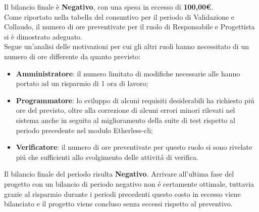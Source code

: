 	Il bilancio finale è \textbf{Negativo}, con una spesa in eccesso di \textbf{100,00\euro}. \\ Come riportato nella tabella del consuntivo per il periodo di Validazione e Collaudo, il numero di ore preventivate per il ruolo di Responsabile e Progettista si è dimostrato adeguato. \\ Segue un'analisi delle motivazioni per cui gli altri ruoli hanno necessitato di un numero di ore differente da quanto previsto:
	\begin{itemize}
		\item \textbf{Amministratore}: il numero limitato di modifiche necessarie alle \NdP{} hanno portato ad un risparmio di 1 ora di lavoro;
		\item \textbf{Programmatore}: lo sviluppo di alcuni requisiti desiderabili ha richiesto piú ore del previsto, oltre alla correzione di alcuni errori minori rilevati nel sistema anche in seguito al miglioramento della suite di test rispetto al periodo precedente nel modulo Etherless-cli;
		\item \textbf{Verificatore}: il numero di ore preventivate per questo ruolo si sono rivelate piú che sufficienti allo svolgimento delle attivitá di verifica.
	\end{itemize}

	Il bilancio finale del periodo risulta \textbf{Negativo}. Arrivare all'ultima fase del progetto con un bilancio di periodo negativo non é certamente ottimale, tuttavia grazie al risparmio durante i periodi precedenti questo costo in eccesso viene bilanciato e il progetto viene concluso senza eccessi rispetto al preventivo.
